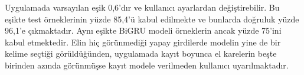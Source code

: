 Uygulamada varsayılan eşik 0,6'dır ve kullanıcı ayarlardan değiştirebilir. Bu eşikte
test örneklerinin yüzde 85,4'ü kabul edilmekte ve bunlarda doğruluk yüzde 96,1'e
çıkmaktadır. Aynı eşikte BiGRU modeli örneklerin ancak yüzde 75'ini kabul
etmektedir. Elin hiç görünmediği yapay girdilerde modelin yine de bir kelime seçtiği
görüldüğünden, uygulamada kayıt boyunca el karelerin beşte birinden azında görünmüşse
kayıt modele verilmeden kullanıcı uyarılmaktadır.
